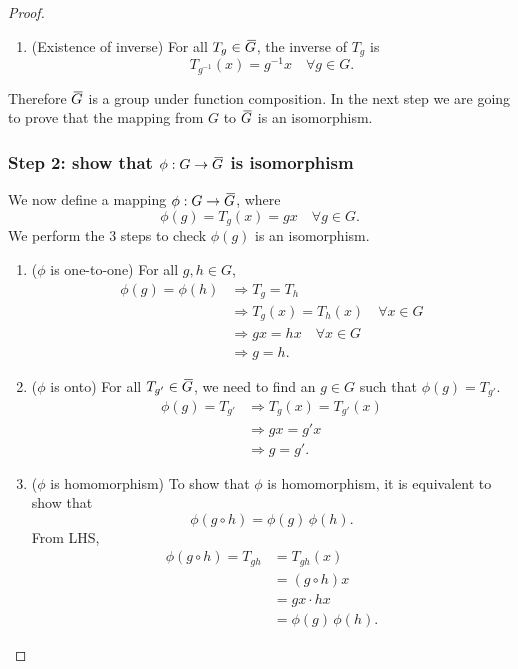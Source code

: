 \begin{proof}
\begin{enumerate}
        \item (Existence of inverse) For all $T_g \in \,\overline{\!{G}}$, the inverse of $T_g$ is 
        \[
            T_{g^{-1}}(x) = g^{-1} x \quad \forall g \in G. 
        \]
    \end{enumerate}
    Therefore $\,\overline{\!{G}}$ is a group under function composition. In the next step we are going to prove that 
    the mapping from $G$ to $\,\overline{\!{G}}$ is an isomorphism.

    \subsubsection*{Step 2: show that $\phi: G \to \,\overline{\!{G}}$ is isomorphism}

    We now define a mapping $\phi: G \to \,\overline{\!{G}}$, where 
    \[
        \phi(g) = T_g(x) = gx \quad \forall g \in G.
    \]
    We perform the 3 steps to check $\phi(g)$ is an isomorphism.

    \begin{enumerate}
        \item ($\phi$ is one-to-one) For all $g, h \in G$, 
        \begin{align*}
            \phi(g) = \phi(h) &\Rightarrow T_g = T_h\\
            &\Rightarrow T_g(x) = T_h(x) \quad \forall x \in G\\
            &\Rightarrow gx = hx \quad \forall x \in G\\
            &\Rightarrow g = h.
        \end{align*}

        \item ($\phi$ is onto) For all $T_{g'} \in \,\overline{\!{G}}$, we need to find an $g \in G$ such that $\phi(g) = T_{g'}$.
        \begin{align*}
            \phi(g) = T_{g'} &\Rightarrow T_g(x) = T_{g'}(x)\\
            &\Rightarrow gx = g'x\\
            &\Rightarrow g = g'.
        \end{align*}

        \item ($\phi$ is homomorphism) To show that $\phi$ is homomorphism, it is equivalent to show that  
        \[
            \phi(g \circ h) = \phi(g)\, \phi(h).
        \]
        From LHS, 
        \begin{align*}
            \phi(g \circ h) = T_{gh} &= T_{gh}(x)\\
            &= (g \circ h)x\\
            &= gx \cdot hx\\
            &= \phi(g)\, \phi(h).
        \end{align*}
    \end{enumerate}

\end{proof}

